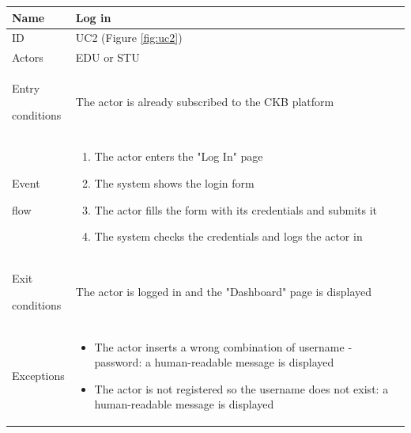 \begin{center}
    \def\arraystretch{1.5}
    \begin{tabular}{| m{2cm} | m{10cm}|}
        \hline
        Name                  & Log in                                                                                                                  \\ \hline
        ID                    & UC2 (Figure \ref{fig:uc2})                                                                                              \\ \hline
        Actors                & EDU or STU                                                                                                              \\ \hline
        Entry \par conditions & The actor is already subscribed to the CKB platform                                                                     \\ \hline
        Event \par flow       & \begin{enumerate}
                                    \item The actor enters the "Log In" page
                                    \item The system shows the login form
                                    \item The actor fills the form with its credentials and submits it
                                    \item The system checks the credentials and logs the actor in
                                \end{enumerate}                                                                                                         \\ \hline
        Exit \par conditions  & The actor is logged in and the "Dashboard" page is displayed                                                            \\ \hline
        Exceptions            & \begin{itemize}
                                    \item The actor inserts a wrong combination of username - password: a human-readable message is displayed
                                    \item The actor is not registered so the username does not exist: a human-readable message is displayed
                                \end{itemize}                                                                                                           \\ \hline
    \end{tabular}
\end{center}

